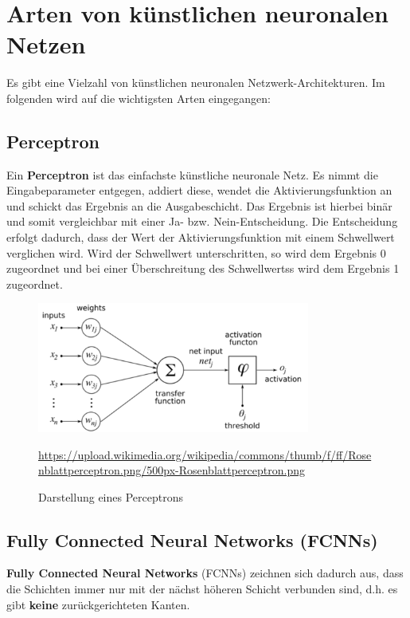\section{Arten von  künstlichen neuronalen Netzen}

Es gibt eine Vielzahl von künstlichen neuronalen Netzwerk-Architekturen. Im folgenden wird auf die wichtigsten Arten eingegangen:

\subsection{Perceptron}

	Ein \textbf{Perceptron} ist das einfachste künstliche neuronale Netz. Es nimmt die Eingabeparameter entgegen, addiert diese, wendet die Aktivierungsfunktion an und schickt das Ergebnis an die Ausgabeschicht. Das Ergebnis ist hierbei binär und somit vergleichbar mit einer Ja- bzw. Nein-Entscheidung. Die Entscheidung erfolgt dadurch, dass der Wert der Aktivierungsfunktion mit einem Schwellwert verglichen wird. Wird der Schwellwert unterschritten, so wird dem Ergebnis 0 zugeordnet und bei einer Überschreitung des Schwellwertss wird dem Ergebnis 1 zugeordnet.
	
	\begin{figure}[H]
		\centering
		\includegraphics[width=0.8\textwidth]{kapitel3/images/perceptron.png}
		\caption{Darstellung eines Perceptrons}
		\vspace{0.2cm}
		\quelle\url{https://upload.wikimedia.org/wikipedia/commons/thumb/f/ff/Rosenblattperceptron.png/500px-Rosenblattperceptron.png}
		\end{figure}

\subsection{Fully Connected Neural Networks (FCNNs)}

	\textbf{Fully Connected Neural Networks} (FCNNs) zeichnen sich dadurch aus, dass die Schichten immer nur mit der nächst höheren Schicht verbunden sind, d.h. es gibt \textbf{keine} zurückgerichteten Kanten. \cite{datasolut4}
	
